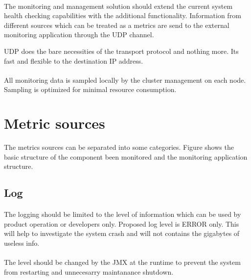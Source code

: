 \paragraph{}
The monitoring and management solution should extend the current system health checking capabilities with the additional functionality.
Information from different sources which can be treated as a metrics are send to the external monitoring application through the UDP channel.

UDP does the bare necessities of the transport protocol and nothing more. Its fast and flexible to the destination IP address.

\paragraph{}
All monitoring data is sampled locally by the cluster management on each node. Sampling is optimized for minimal resource consumption.

\section*{Metric sources}
\paragraph{}
The metrics sources can be separated into some categories.
Figure shows the basic structure of the component been monitored and the monitoring application structure.

\subsection*{Log}
\paragraph{}
The logging should be limited to the level of information which can be used by product operation or developers only.
Proposed log level is ERROR only. This will help to investigate the system crash and will not contains the gigabytes of useless info.

\paragraph{}
The level should be changed by the JMX at the runtime to prevent the system from restarting and unnecesarry maintanance shutdown.

